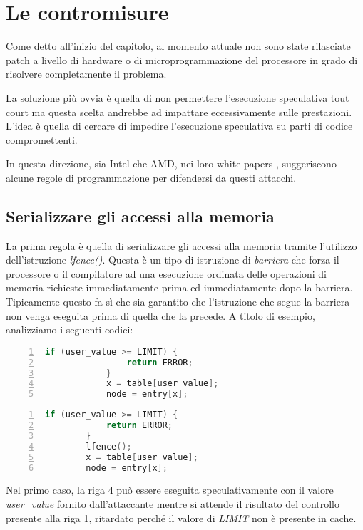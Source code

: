 	\section{Le contromisure}
		Come detto all'inizio del capitolo, al momento attuale non sono state rilasciate patch a livello di hardware o di microprogrammazione del processore in grado di risolvere completamente il problema.
		
		La soluzione più ovvia è quella di non permettere l'esecuzione speculativa tout court ma questa scelta andrebbe ad impattare eccessivamente sulle prestazioni. L'idea è quella di cercare di impedire l'esecuzione speculativa su parti di codice compromettenti.
		
		In questa direzione, sia Intel che AMD, nei loro white papers \cite{AMD2018speculation,intel2018speculative}, suggeriscono alcune regole di programmazione per difendersi da questi attacchi.
		
		\subsection{Serializzare gli accessi alla memoria}
		
		La prima regola è quella di serializzare gli accessi alla memoria tramite l'utilizzo dell'istruzione \emph{lfence()}. Questa è un tipo di istruzione di \emph{barriera} che forza il processore o il compilatore ad una esecuzione ordinata delle operazioni di memoria richieste immediatamente prima ed immediatamente dopo la barriera. Tipicamente questo fa sì che sia garantito che l'istruzione che segue la barriera non venga eseguita prima di quella che la precede. A titolo di esempio, analizziamo i seguenti codici:
		
		\begin{lstlisting}[language={C},frame={blrt},basicstyle=\footnotesize,numbers=left,numberstyle=\scriptsize\color{black}]
			if (user_value >= LIMIT) {
				return ERROR;
			} 
			x = table[user_value]; 
			node = entry[x];
		\end{lstlisting}
		
		\begin{lstlisting}[language={C},frame={rlbt},basicstyle=\footnotesize,numbers=left,numberstyle=\scriptsize\color{black}]
		if (user_value >= LIMIT) {
			return ERROR;
		} 
		lfence(); 
		x = table[user_value]; 
		node = entry[x];
		\end{lstlisting}
		
		Nel primo caso, la riga 4 può essere eseguita speculativamente con il valore \emph{user\_value} fornito dall'attaccante mentre si attende il risultato del controllo presente alla riga 1, ritardato perché il valore di \emph{LIMIT} non è presente in cache.
		
